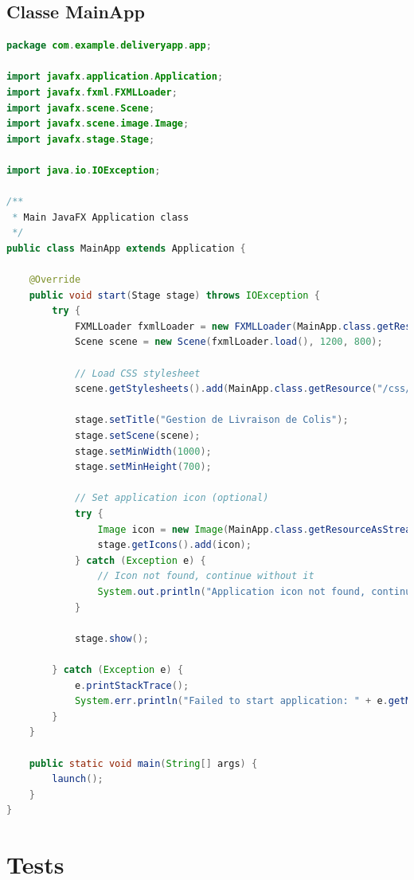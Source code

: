 \documentclass{rapportENSIAS}
\begin{document}
\subsection{Classe MainApp}

\begin{lstlisting}[language=Java, caption=Classe principale de l'application]
package com.example.deliveryapp.app;

import javafx.application.Application;
import javafx.fxml.FXMLLoader;
import javafx.scene.Scene;
import javafx.scene.image.Image;
import javafx.stage.Stage;

import java.io.IOException;

/**
 * Main JavaFX Application class
 */
public class MainApp extends Application {
    
    @Override
    public void start(Stage stage) throws IOException {
        try {
            FXMLLoader fxmlLoader = new FXMLLoader(MainApp.class.getResource("/fxml/MainView.fxml"));
            Scene scene = new Scene(fxmlLoader.load(), 1200, 800);
            
            // Load CSS stylesheet
            scene.getStylesheets().add(MainApp.class.getResource("/css/styles.css").toExternalForm());
            
            stage.setTitle("Gestion de Livraison de Colis");
            stage.setScene(scene);
            stage.setMinWidth(1000);
            stage.setMinHeight(700);
            
            // Set application icon (optional)
            try {
                Image icon = new Image(MainApp.class.getResourceAsStream("/images/icon.png"));
                stage.getIcons().add(icon);
            } catch (Exception e) {
                // Icon not found, continue without it
                System.out.println("Application icon not found, continuing without it.");
            }
            
            stage.show();
            
        } catch (Exception e) {
            e.printStackTrace();
            System.err.println("Failed to start application: " + e.getMessage());
        }
    }

    public static void main(String[] args) {
        launch();
    }
}
\end{lstlisting}

\section{Tests}
\end{document}
